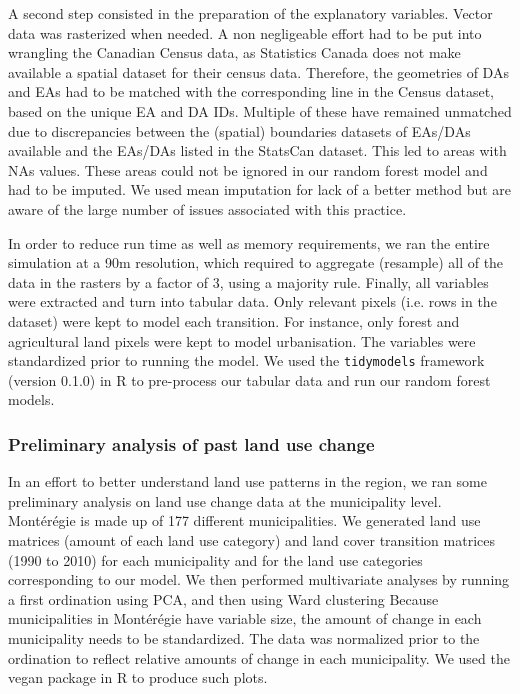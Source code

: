 A second step consisted in the preparation of the explanatory variables. Vector data was rasterized when needed. A non negligeable effort had to be put into wrangling the Canadian Census data, as Statistics Canada does not make available a spatial dataset for their census data. Therefore, the geometries of DAs and EAs had to be matched with the corresponding line in the Census dataset, based on the unique EA and DA IDs. Multiple of these have remained unmatched due to discrepancies between the (spatial) boundaries datasets of EAs/DAs available and the EAs/DAs listed in the StatsCan dataset. This led to areas with NAs values. These areas could not be ignored in our random forest model and had to be imputed. We used mean imputation for lack of a better method but are aware of the large number of issues associated with this practice. %

In order to reduce run time as well as memory requirements, we ran the entire simulation at a 90m resolution, which required to aggregate (resample) all of the data in the rasters by a factor of 3, using a majority rule. Finally, all variables were extracted and turn into tabular data. Only relevant pixels (i.e. rows in the dataset) were kept to model each transition. For instance, only forest and agricultural land pixels were kept to model urbanisation. The variables were standardized prior to running the model. We used the \verb|tidymodels| framework (version 0.1.0) in R to pre-process our tabular data and run our random forest models. \\

\subsubsection{Preliminary analysis of past land use change}
In an effort to better understand land use patterns in the region, we ran some preliminary analysis on land use change data at the municipality level. Montérégie is made up of 177 different municipalities. We generated land use matrices (amount of each land use category) and land cover transition matrices (1990 to 2010) for each municipality and for the land use categories corresponding to our model. We then performed multivariate analyses by running a first ordination using PCA, and then using Ward clustering %
Because municipalities in Montérégie have variable size, the amount of change in each municipality needs to be standardized. The data was normalized prior to the ordination to reflect relative amounts of change in each municipality. We used the vegan package in R to produce such plots.\\

